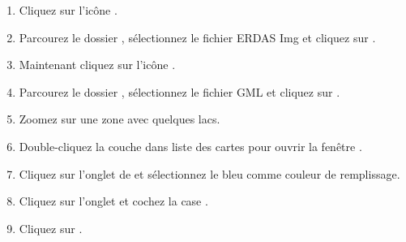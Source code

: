 

\begin{enumerate} \item Cliquez sur l'ic\^one .
\item Parcourez le dossier , s\'electionnez le fichier ERDAS Img  et cliquez sur .
\item Maintenant cliquez sur l'ic\^one .
\item Parcourez le dossier , s\'electionnez le fichier GML  et cliquez sur .
\item Zoomez sur une zone avec quelques lacs.
\item Double-cliquez la couche  dans liste des cartes pour ouvrir la fen\^etre .
\item Cliquez sur l'onglet de  et s\'electionnez le bleu comme couleur de remplissage.
\item Cliquez sur l'onglet  et cochez la case .
\item Cliquez sur .
\end{enumerate} 

